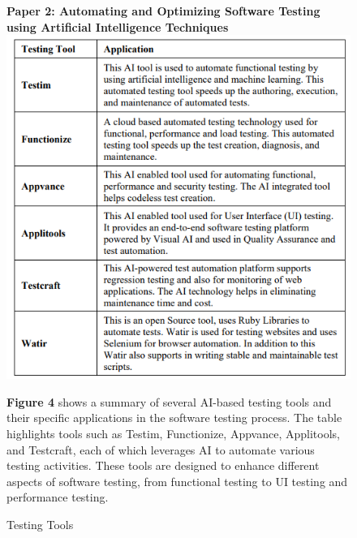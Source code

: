 \documentclass[12pt,a4paper]{article}
\begin{document}
\newpage
\begin{figure}[h]
    \textbf{Paper 2: Automating and Optimizing Software Testing using Artificial Intelligence Techniques}
    \centering
    \includegraphics[width=0.8\linewidth]{testingtools.png}
    \caption{Testing Tools}
    \label{fig:enter-label}
    \vspace{0.8em}
    \textbf{Figure 4} shows a summary of several AI-based testing tools and their specific applications in the software testing process. The table highlights tools such as Testim, Functionize, Appvance, Applitools, and Testcraft, each of which leverages AI to automate various testing activities. These tools are designed to enhance different aspects of software testing, from functional testing to UI testing and performance testing.
\end{figure}
\end{document}
